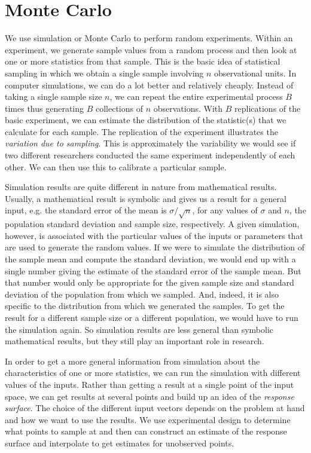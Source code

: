 \section{Monte Carlo}
We use simulation or Monte Carlo to perform random experiments.
Within an experiment, we generate sample values from a random process
and then look at one or more statistics from that sample.  This is the
basic idea of statistical sampling in which we obtain a single sample
involving $n$ observational units.  In computer simulations, we can do
a lot better and relatively cheaply.  Instead of taking a single
sample size $n$, we can repeat the entire experimental process $B$
times thus generating $B$ collections of $n$ observations.  With $B$
replications of the basic experiment, we can estimate the distribution
of the statistic(s) that we calculate for each sample.  The
replication of the experiment illustrates the \textit{variation due to
  sampling}.  This is approximately the variability we would see if
two different researchers conducted the same experiment independently
of each other.  We can then use this to calibrate a particular sample.



Simulation results are quite different in nature from mathematical
results. Usually, a mathematical result is symbolic and gives us a
result for a general input, e.g. the standard error of the mean is
$\sigma/\sqrt{n}$, for any values of $\sigma$ and $n$, the population
standard deviation and sample size, respectively.  A given simulation,
however, is associated with the particular values of the inputs or
parameters that are used to generate the random values.  If we were to
simulate the distribution of the sample mean and compute the standard
deviation, we would end up with a single number giving the estimate of
the standard error of the sample mean.  But that number would only be
appropriate for the given sample size and standard deviation of the
population from which we sampled. And, indeed, it is also specific to
the distribution from which we generated the samples.  To get the
result for a different sample size or a different population, we would
have to run the simulation again.  So simulation results are less
general than symbolic mathematical results, but they still play an
important role in research.

In order to get a more general information from simulation about the
characteristics of one or more statistics, we can run the simulation
with different values of the inputs.  Rather than getting a result at
a single point of the input space, we can get results at several
points and build up an idea of the \textit{response surface}.  The
choice of the different input vectors depends on the problem at hand
and how we want to use the results.  We use experimental design to
determine what points to sample at and then can construct an estimate
of the response surface and interpolate to get estimates for
unobserved points.



